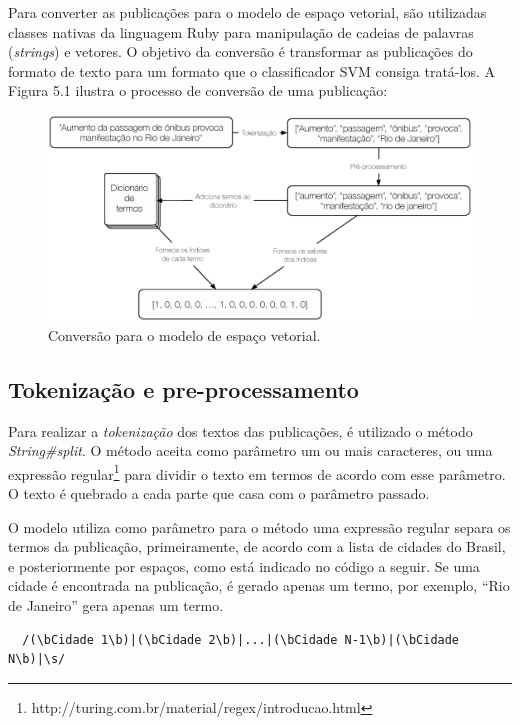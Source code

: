 Para converter as publicações para o modelo de espaço vetorial, são utilizadas classes nativas da linguagem Ruby para manipulação de cadeias de palavras (\textit{strings}) e vetores. O objetivo da conversão é transformar as publicações do formato de texto para um formato que o classificador SVM consiga tratá-los. A Figura 5.1 ilustra o processo de conversão de uma publicação:

\begin{figure}[htpb]
  \begin{center}
    \includegraphics[width=1.0\textwidth]{figuras/conversao-modelo-espaco.eps}
    \caption{Conversão para o modelo de espaço vetorial.}
  \end{center}
\end{figure}

\subsection*{Tokenização e pre-processamento}

Para realizar a \textit{tokenização} dos textos das publicações, é utilizado o método \textit{String\#split}. O método aceita como parâmetro um ou mais caracteres, ou uma expressão regular\footnote{http://turing.com.br/material/regex/introducao.html} para dividir o texto em termos de acordo com esse parâmetro. O texto é quebrado a cada parte que casa com o parâmetro passado. 

O modelo utiliza como parâmetro para o método uma expressão regular separa os termos da publicação, primeiramente, de acordo com a lista de cidades do Brasil, e posteriormente por espaços, como está indicado no código a seguir. Se uma cidade é encontrada na publicação, é gerado apenas um termo, por exemplo, ``Rio de Janeiro'' gera apenas um termo.

\begin{lstlisting}
  /(\bCidade 1\b)|(\bCidade 2\b)|...|(\bCidade N-1\b)|(\bCidade N\b)|\s/
\end{lstlisting}

